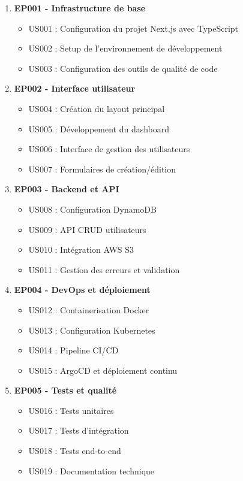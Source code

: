 \begin{enumerate}
    \item \textbf{EP001 - Infrastructure de base}
    \begin{itemize}
        \item US001 : Configuration du projet Next.js avec TypeScript
        \item US002 : Setup de l'environnement de développement
        \item US003 : Configuration des outils de qualité de code
    \end{itemize}
    
    \item \textbf{EP002 - Interface utilisateur}
    \begin{itemize}
        \item US004 : Création du layout principal
        \item US005 : Développement du dashboard
        \item US006 : Interface de gestion des utilisateurs
        \item US007 : Formulaires de création/édition
    \end{itemize}
    
    \item \textbf{EP003 - Backend et API}
    \begin{itemize}
        \item US008 : Configuration DynamoDB
        \item US009 : API CRUD utilisateurs
        \item US010 : Intégration AWS S3
        \item US011 : Gestion des erreurs et validation
    \end{itemize}
    
    \item \textbf{EP004 - DevOps et déploiement}
    \begin{itemize}
        \item US012 : Containerisation Docker
        \item US013 : Configuration Kubernetes
        \item US014 : Pipeline CI/CD
        \item US015 : ArgoCD et déploiement continu
    \end{itemize}
    
    \item \textbf{EP005 - Tests et qualité}
    \begin{itemize}
        \item US016 : Tests unitaires
        \item US017 : Tests d'intégration
        \item US018 : Tests end-to-end
        \item US019 : Documentation technique
    \end{itemize}
\end{enumerate}

